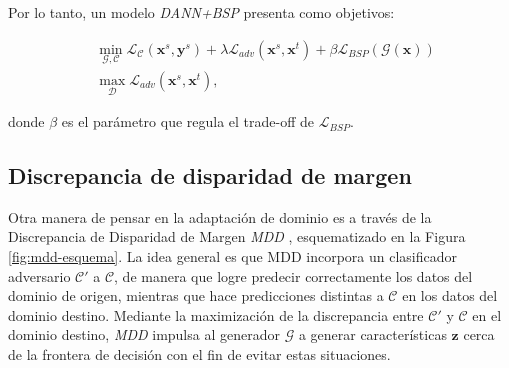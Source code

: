 Por lo tanto, un modelo {\it DANN+BSP} presenta como objetivos:

\begin{align}
   & \min_{\mathcal{G},\mathcal{C}} \mathcal{L}_\mathcal{C}(\mathbf{x}^s, \mathbf{y}^s) + \lambda \mathcal{L}_{adv}(\mathbf{x}^s, \mathbf{x}^t) + \beta \mathcal{L}_{BSP}(\mathcal{G}(\mathbf{x})) \\
   & \max_{\mathcal{D}} \mathcal{L}_{adv}(\mathbf{x}^s, \mathbf{x}^t),
  \label{eq:bsp-dann-obejtivo}
\end{align}

\noindent
donde $\beta$ es el parámetro que regula el trade-off de $\mathcal{L}_{BSP}$.

\subsection{Discrepancia de disparidad de margen}

Otra manera de pensar en la adaptación de dominio es a través de la Discrepancia de Disparidad de Margen {\it MDD} \parencite{zhang2019bridging}, esquematizado en la Figura \ref{fig:mdd-esquema}. La idea general es que MDD incorpora un
clasificador adversario $\mathcal{C'}$ a $\mathcal{C}$, de manera que logre predecir correctamente los datos del
dominio de origen, mientras que hace predicciones distintas a $\mathcal{C}$ en los datos del dominio destino. Mediante
la maximización de la discrepancia entre $\mathcal{C'}$ y $\mathcal{C}$ en el dominio destino, {\it MDD} impulsa al
generador $\mathcal{G}$ a generar características $\mathbf{z}$ cerca de la frontera de decisión con el fin de evitar
estas situaciones.

